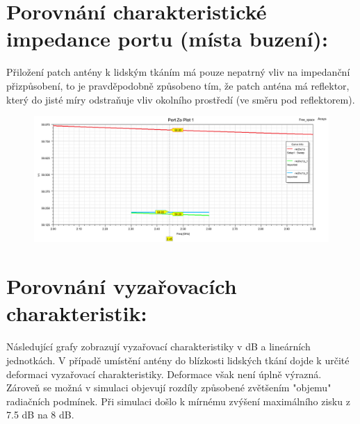 \documentclass[10pt, a4paper]{article}%
\begin{document}
\section{\Large Porovnání charakteristické impedance portu (místa buzení):}
Přiložení patch antény k lidským tkáním má pouze nepatrný vliv na impedanční přizpůsobení,
to je pravděpodobně způsobeno tím, že patch anténa má reflektor, který do jisté míry odstraňuje
vliv okolního prostředí (ve směru pod reflektorem).
\begin{figure}[ht!]	
\centering
		\includegraphics[height = 0.3\textheight]{Z0_free_space.png}
\end{figure}

\section{\Large Porovnání vyzařovacích charakteristik:}
Následující grafy zobrazují vyzařovací charakteristiky v dB a lineárních 
jednotkách. V případě umístění antény do blízkosti lidských tkání dojde k určité deformaci
vyzařovací charakteristiky. Deformace však není úplně výrazná. Zároveň se možná v simulaci objevují
rozdíly způsobené zvětšením "objemu" radiačních podmínek.
Při simulaci došlo k mírnému zvýšení maximálního zisku z 7.5 dB na 8 dB.
\end{document}
